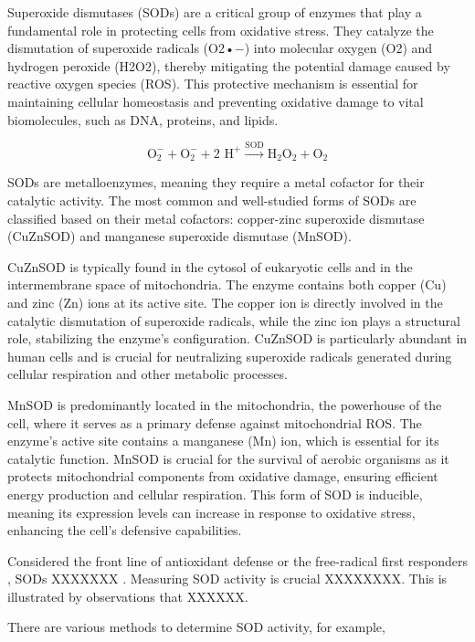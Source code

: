 \documentclass[
  9pt,
  american,
  a5paper,
  extrafontsizes,onecolumn,openright
  ]{memoir}
\begin{document}
Superoxide dismutases (SODs) are a critical group of enzymes that play a fundamental role in protecting cells from oxidative stress. They catalyze the dismutation of superoxide radicals (O2•−) into molecular oxygen (O2) and hydrogen peroxide (H2O2), thereby mitigating the potential damage caused by reactive oxygen species (ROS). This protective mechanism is essential for maintaining cellular homeostasis and preventing oxidative damage to vital biomolecules, such as DNA, proteins, and lipids.

\[
\text{O}_2^- + \text{O}_2^- + \text{2 H}^+ \overset{\text{SOD}}{\rightarrow} \text{H}_2\text{O}_2 + \text{O}_2
\]

SODs are metalloenzymes, meaning they require a metal cofactor for their catalytic activity. The most common and well-studied forms of SODs are classified based on their metal cofactors: copper-zinc superoxide dismutase (CuZnSOD) and manganese superoxide dismutase (MnSOD).

CuZnSOD is typically found in the cytosol of eukaryotic cells and in the intermembrane space of mitochondria. The enzyme contains both copper (Cu) and zinc (Zn) ions at its active site. The copper ion is directly involved in the catalytic dismutation of superoxide radicals, while the zinc ion plays a structural role, stabilizing the enzyme's configuration. CuZnSOD is particularly abundant in human cells and is crucial for neutralizing superoxide radicals generated during cellular respiration and other metabolic processes.

MnSOD is predominantly located in the mitochondria, the powerhouse of the cell, where it serves as a primary defense against mitochondrial ROS. The enzyme's active site contains a manganese (Mn) ion, which is essential for its catalytic function. MnSOD is crucial for the survival of aerobic organisms as it protects mitochondrial components from oxidative damage, ensuring efficient energy production and cellular respiration. This form of SOD is inducible, meaning its expression levels can increase in response to oxidative stress, enhancing the cell's defensive capabilities.

Considered the front line of antioxidant defense \autocite{ighodaro_first_2018} or the free-radical first responders \autocite{dawson_free-radical_2015}, SODs XXXXXXX . Measuring SOD activity is crucial XXXXXXXX. This is illustrated by observations that XXXXXX.

There are various methods to determine SOD activity, for example,
\end{document}
